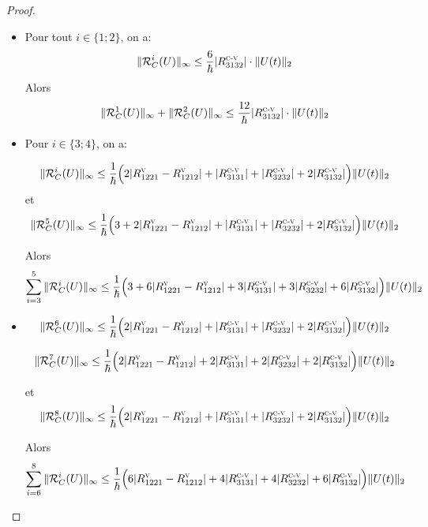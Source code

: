 \documentclass[12pt,a4paper,openany,oneside]{book}
\begin{document}
{{{{{{\begin{proof}
\begin{enumerate}
\begin{itemize}[label=$\bullet$]
 \item Pour tout $i\in \{1;2\}$, on a:
$$ \Vert \mathcal{R}^{i}_{C}(U)\Vert_{\infty}  \leq \dfrac{6}{\hbar}\vert R^{\textsc{c-v}}_{3132} \vert\cdot\Vert U(t)\Vert_{2} $$
Alors 
$$ \Vert \mathcal{R}^{1}_{C}(U)\Vert_{\infty}+\Vert \mathcal{R}^{2}_{C}(U)\Vert_{\infty}   \leq \dfrac{12}{\hbar}\vert R^{\textsc{c-v}}_{3132} \vert\cdot\Vert U(t)\Vert_{2} $$

\item Pour $i\in \{3;4\}$, on a:

$$ \Vert \mathcal{R}^{i}_{C}(U)\Vert_{\infty}  \leq \dfrac{1}{\hbar}\Big(2\vert R^{\textsc{v}}_{1221}-R^{\textsc{v}}_{1212}\vert + \vert R^{\textsc{c-v}}_{3131}\vert + \vert R^{\textsc{c-v}}_{3232}\vert + 2\vert R^{\textsc{c-v}}_{3132} \vert\Big )\Vert U(t)\Vert_{2}  $$
et 
$$ \Vert \mathcal{R}^{5}_{C}(U)\Vert_{\infty} \leq \dfrac{1}{\hbar}\Big(3+2\vert R^{\textsc{v}}_{1221}-R^{\textsc{v}}_{1212}\vert + \vert R^{\textsc{c-v}}_{3131}\vert + \vert R^{\textsc{c-v}}_{3232}\vert + 2\vert R^{\textsc{c-v}}_{3132} \vert\Big )\Vert U(t)\Vert_{2}$$

Alors 
$$ \sum_{i=3}^{5}\Vert \mathcal{R}^{i}_{C}(U)\Vert_{\infty}  \leq \dfrac{1}{\hbar}\Big(3+6\vert R^{\textsc{v}}_{1221}-R^{\textsc{v}}_{1212}\vert + 3\vert R^{\textsc{c-v}}_{3131}\vert + 3\vert R^{\textsc{c-v}}_{3232}\vert + 6\vert R^{\textsc{c-v}}_{3132} \vert\Big )\Vert U(t)\Vert_{2} $$

\item 
$$ \Vert \mathcal{R}^{6}_{C}(U)\Vert_{\infty}  \leq \dfrac{1}{\hbar}\Big(2\vert R^{\textsc{v}}_{1221}-R^{\textsc{v}}_{1212}\vert + \vert R^{\textsc{c-v}}_{3131}\vert + \vert R^{\textsc{c-v}}_{3232}\vert + 2\vert R^{\textsc{c-v}}_{3132} \vert\Big )\Vert U(t)\Vert_{2}  $$

$$ \Vert \mathcal{R}^{7}_{C}(U)\Vert_{\infty}  \leq \dfrac{1}{\hbar}\Big(2\vert R^{\textsc{v}}_{1221}-R^{\textsc{v}}_{1212}\vert + 2\vert R^{\textsc{c-v}}_{3131}\vert + 2\vert R^{\textsc{c-v}}_{3232}\vert + 2\vert R^{\textsc{c-v}}_{3132} \vert\Big )\Vert U(t)\Vert_{2}  $$

et 
$$ \Vert \mathcal{R}^{8}_{C}(U)\Vert_{\infty}  \leq \dfrac{1}{\hbar}\Big(2\vert R^{\textsc{v}}_{1221}-R^{\textsc{v}}_{1212}\vert + \vert R^{\textsc{c-v}}_{3131}\vert + \vert R^{\textsc{c-v}}_{3232}\vert + 2\vert R^{\textsc{c-v}}_{3132} \vert\Big )\Vert U(t)\Vert_{2}  $$

Alors 
$$ \sum_{i=6}^{8}\Vert \mathcal{R}^{i}_{C}(U)\Vert_{\infty}  \leq \dfrac{1}{\hbar}\Big(6\vert R^{\textsc{v}}_{1221}-R^{\textsc{v}}_{1212}\vert + 4\vert R^{\textsc{c-v}}_{3131}\vert + 4\vert R^{\textsc{c-v}}_{3232}\vert + 6\vert R^{\textsc{c-v}}_{3132} \vert\Big )\Vert U(t)\Vert_{2} $$
  

\end{itemize}
\end{enumerate}
\end{proof}}}}}}}
\end{document}
